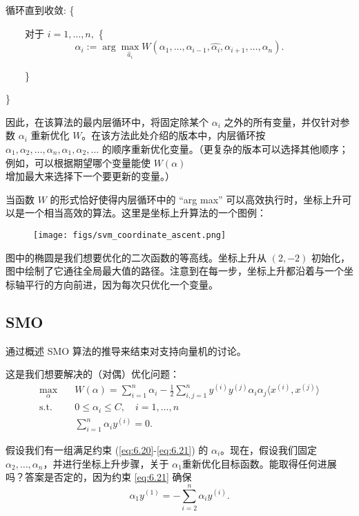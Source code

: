 循环直到收敛: \{

    $\quad\quad$对于 $i=1,\dots,n,$ \{
        \[
            \alpha_i := \arg\max_{\hat a_i} W(\alpha_1,\dots,\alpha_{i-1},\hat{\alpha_i},\alpha_{i+1},\dots,\alpha_n).
        \]
        
    $\quad\quad$\}

\}

因此，在该算法的最内层循环中，将固定除某个 $\alpha_i$ 之外的所有变量，并仅针对参数 $\alpha_i$ 重新优化 $W$。在该方法此处介绍的版本中，内层循环按 $\alpha_1, \alpha_2, \dots, \alpha_n, \alpha_1, \alpha_2, \dots$ 的顺序重新优化变量。（更复杂的版本可以选择其他顺序；例如，可以根据期望哪个变量能使 $W(\alpha)$ 增加最大来选择下一个要更新的变量。）

当函数 $W$ 的形式恰好使得内层循环中的 “arg max” 可以高效执行时，坐标上升可以是一个相当高效的算法。这里是坐标上升算法的一个图例：

\begin{figure}[H]
    \centering
    \texttt{[image: figs/svm\_coordinate\_ascent.png]}
\end{figure}


图中的椭圆是我们想要优化的二次函数的等高线。坐标上升从 $(2, -2)$ 初始化，图中绘制了它通往全局最大值的路径。注意到在每一步，坐标上升都沿着与一个坐标轴平行的方向前进，因为每次只优化一个变量。

\subsection{SMO}

通过概述 SMO 算法的推导来结束对支持向量机的讨论。

这是我们想要解决的（对偶）优化问题：
\begin{align}
    \max_\alpha \quad &W(\alpha) = \sum_{i=1}^n \alpha_i - \frac{1}{2} \sum_{i,j=1}^n y^{(i)} y^{(j)} \alpha_i \alpha_j \langle x^{(i)}, x^{(j)} \rangle \\
    \text{s.t.} \quad &0 \le \alpha_i \le C, \quad i=1,\dots,n \label{eq:6.20}\\
    &\sum_{i=1}^n \alpha_i y^{(i)} = 0. \label{eq:6.21}
\end{align}

假设我们有一组满足约束 (\eqref{eq:6.20}-\eqref{eq:6.21}) 的 $\alpha_i$。现在，假设我们固定 $\alpha_2, \dots, \alpha_n$，并进行坐标上升步骤，关于 $\alpha_1$重新优化目标函数。能取得任何进展吗？答案是否定的，因为约束 \eqref{eq:6.21} 确保
\[
    \alpha_1 y^{(1)} = - \sum_{i=2}^n \alpha_i y^{(i)}.
\]

